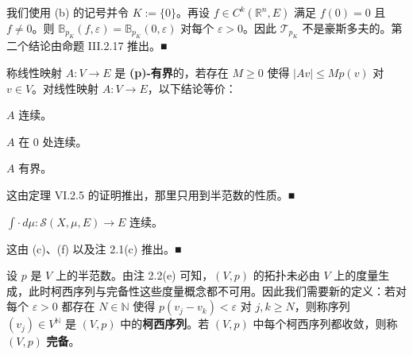 \begin{remark}
\begin{items}
\proofhead
我们使用 (b) 的记号并令 $ K := \{0\} $。再设 $ f \in C^{k}(\mathbb{R}^n, E) $ 满足 $ f(0) = 0 $ 且 $ f \ne 0 $。则 $ \mathbb{B}_{p_K}(f,\varepsilon) = \mathbb{B}_{p_K}(0,\varepsilon) $ 对每个 $ \varepsilon > 0 $。因此 $ \mathcal{T}_{p_K} $ 不是豪斯多夫的。第二个结论由命题 III.2.17 推出。\nobreak\hspace{0.35em}■
\item

称线性映射 $ A : V \to E $ 是 \textbf{(p)-有界}的，若存在 $ M \ge 0 $ 使得 $ |Av| \le M p(v) $ 对 $ v \in V $。对线性映射 $ A : V \to E $，以下结论等价：

\begin{subitems}
\item

$ A $ 连续。

\item

$ A $ 在 0 处连续。

\item

$ A $ 有界。

\proofhead
这由定理 VI.2.5 的证明推出，那里只用到半范数的性质。\nobreak\hspace{0.35em}■
\end{subitems}

\item

$ \int \cdot \, d\mu : \mathcal{S}(X,\mu,E) \to E $ 连续。

\proofhead
这由 (c)、(f) 以及注 2.1(c) 推出。\nobreak\hspace{0.35em}■
\end{items}

设 $ p $ 是 $ V $ 上的半范数。由注 2.2(e) 可知，$ (V,p) $ 的拓扑未必由 $ V $ 上的度量生成，此时柯西序列与完备性这些度量概念都不可用。因此我们需要新的定义：若对每个 $ \varepsilon > 0 $ 都存在 $ N \in \mathbb{N} $ 使得 $ p(v_j - v_k) < \varepsilon $ 对 $ j, k \ge N $，则称序列 $ (v_j) \in V^{\mathbb{N}} $ 是 $ (V,p) $ 中的\textbf{柯西序列}。若 $ (V,p) $ 中每个柯西序列都收敛，则称 $ (V,p) $ \textbf{完备}。

\end{remark}

